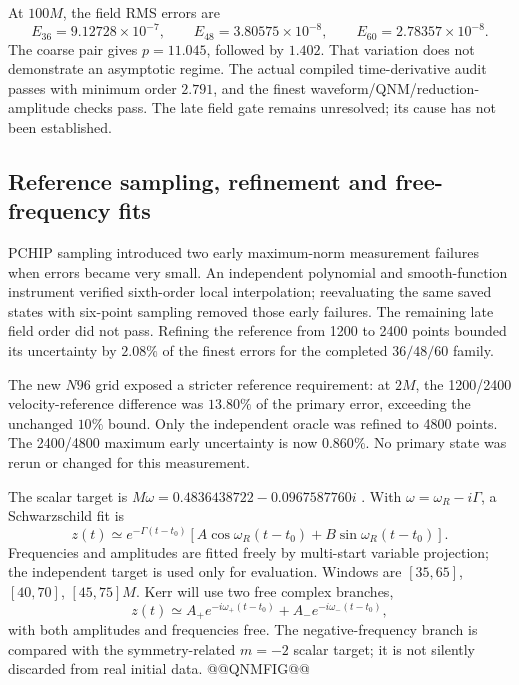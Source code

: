 \documentclass[11pt,letterpaper]{article}
\begin{document}
At $100M$, the field RMS errors are
\begin{equation}
 E_{36}=9.12728\times10^{-7},\qquad E_{48}=3.80575\times10^{-8},\qquad
 E_{60}=2.78357\times10^{-8}.
\end{equation}
The coarse pair gives $p=11.045$, followed by $1.402$. That variation does not demonstrate an asymptotic regime. The actual compiled time-derivative audit passes with minimum order $2.791$, and the finest waveform/QNM/reduction-amplitude checks pass. The late field gate remains unresolved; its cause has not been established.

\clearpage
\subsection{Reference sampling, refinement and free-frequency fits}
PCHIP sampling introduced two early maximum-norm measurement failures when errors became very small. An independent polynomial and smooth-function instrument verified sixth-order local interpolation; reevaluating the same saved states with six-point sampling removed those early failures. The remaining late field order did not pass. Refining the reference from 1200 to 2400 points bounded its uncertainty by $2.08\%$ of the finest errors for the completed $36/48/60$ family.

The new $N96$ grid exposed a stricter reference requirement: at $2M$, the 1200/2400 velocity-reference difference was $13.80\%$ of the primary error, exceeding the unchanged $10\%$ bound. Only the independent oracle was refined to 4800 points. The 2400/4800 maximum early uncertainty is now $0.860\%$. No primary state was rerun or changed for this measurement.

The scalar target is $M\omega=0.4836438722-0.0967587760i$ \cite{qnm}. With $\omega=\omega_R-i\Gamma$, a Schwarzschild fit is
\begin{equation}
 z(t)\simeq e^{-\Gamma(t-t_0)}\left[A\cos\omega_R(t-t_0)+B\sin\omega_R(t-t_0)\right].
\end{equation}
Frequencies and amplitudes are fitted freely by multi-start variable projection; the independent target is used only for evaluation. Windows are $[35,65]$, $[40,70]$, $[45,75]M$. Kerr will use two free complex branches,
\begin{equation}
 z(t)\simeq A_+e^{-i\omega_+(t-t_0)}+A_-e^{-i\omega_-(t-t_0)},
\end{equation}
with both amplitudes and frequencies free. The negative-frequency branch is compared with the symmetry-related $m=-2$ scalar target; it is not silently discarded from real initial data.
@@QNMFIG@@
\end{document}

